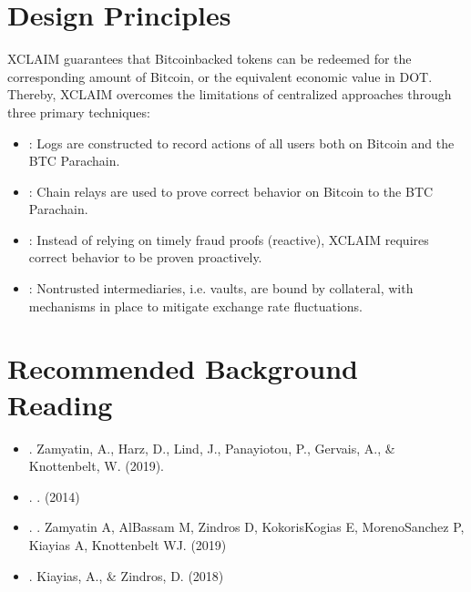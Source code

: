 \documentclass[a4paper,10pt,english]{sphinxmanual}
\begin{document}
\section{Design Principles}
\label{\detokenize{intro/CbA:design-principles}}
XCLAIM guarantees that Bitcoin\sphinxhyphen{}backed tokens can be redeemed for the corresponding amount of Bitcoin, or the equivalent economic value in DOT. Thereby, XCLAIM overcomes the limitations of centralized approaches through three primary techniques:
\begin{itemize}
\item {} 
: Logs are constructed to record actions of all users both on Bitcoin and the BTC Parachain.

\item {} 
: Chain relays are used to prove correct behavior on Bitcoin to the BTC Parachain.

\item {} 
: Instead of relying on timely fraud proofs (reactive), XCLAIM requires correct behavior to be proven proactively.

\item {} 
: Non\sphinxhyphen{}trusted intermediaries, i.e. vaults, are bound by collateral, with mechanisms in place to mitigate exchange rate fluctuations.

\end{itemize}


\section{Recommended Background Reading}
\label{\detokenize{intro/CbA:recommended-background-reading}}\begin{itemize}
\item {} 
.  Zamyatin, A., Harz, D., Lind, J., Panayiotou, P., Gervais, A., \& Knottenbelt, W. (2019).

\item {} 
. . (2014)

\item {} 
. . Zamyatin A, Al\sphinxhyphen{}Bassam M, Zindros D, Kokoris\sphinxhyphen{}Kogias E, Moreno\sphinxhyphen{}Sanchez P, Kiayias A, Knottenbelt WJ. (2019)

\item {} 
.  Kiayias, A., \& Zindros, D. (2018)

\end{itemize}
\end{document}
